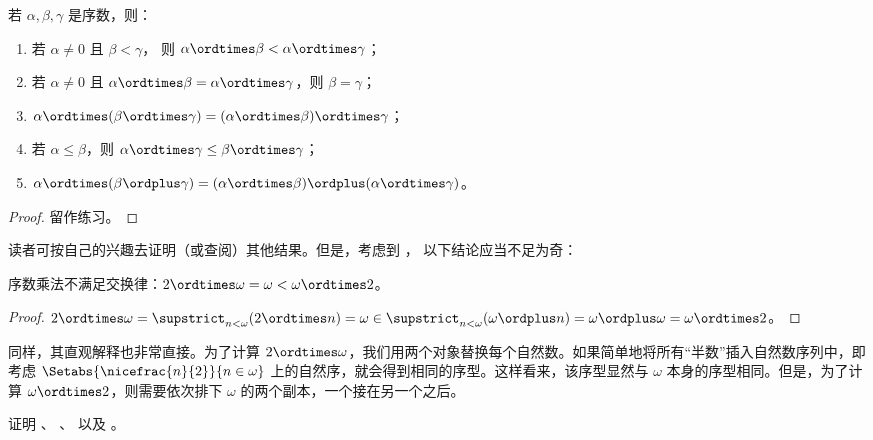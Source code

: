 \documentclass[../../../include/open-logic-section]{subfiles}
\begin{document}
\begin{lem}
若 $\alpha, \beta, \gamma$ 是序数，则：
\begin{enumerate}
	\item{} 若 $\alpha \neq 0$ 且 $\beta < \gamma$，
	则 $\alpha \ordtimes \beta < \alpha \ordtimes \gamma$；
	\item{} 若 $\alpha \neq 0$ 且 $\alpha \ordtimes
	\beta = \alpha\ordtimes\gamma$，则 $\beta = \gamma$；
	\item{}  $\alpha \ordtimes (\beta \ordtimes
	\gamma) = (\alpha \ordtimes \beta) \ordtimes \gamma$；
	\item{}  若 $\alpha \leq \beta$，则 $\alpha
	\ordtimes \gamma \leq \beta \ordtimes \gamma$；
	\item{}  $\alpha \ordtimes (\beta \ordplus
	\gamma) = (\alpha \ordtimes \beta )\ordplus (\alpha\ordtimes
	\gamma)$。
\end{enumerate}
\end{lem}

\begin{proof}
留作练习。
\end{proof}

读者可按自己的兴趣去证明（或查阅）其他结果。但是，考虑到
，
以下结论应当不足为奇：

\begin{prop}
序数乘法不满足交换律：$2 \ordtimes \omega  =
\omega < \omega \ordtimes 2$。
\end{prop}

\begin{proof}
$2 \ordtimes \omega = \supstrict_{n < \omega}(2\ordtimes  n) = \omega \in \supstrict_{n < \omega}(\omega \ordplus n) = \omega \ordplus \omega = \omega \ordtimes 2$。
\end{proof}
\noindent
同样，其直观解释也非常直接。为了计算 $2
\ordtimes \omega$，我们用两个对象替换每个自然数。如果简单地将所有“半数”插入自然数序列中，即考虑 $\Setabs{\nicefrac{n}{2}}{n \in \omega}$ 上的自然序，就会得到相同的序型。这样看来，该序型显然与 $\omega$ 本身的序型相同。但是，为了计算 $\omega \ordtimes 2$，则需要依次排下 $\omega$ 的两个副本，一个接在另一个之后。

\begin{prob}
证明
、
、
以及
。
\end{prob}
\end{document}

